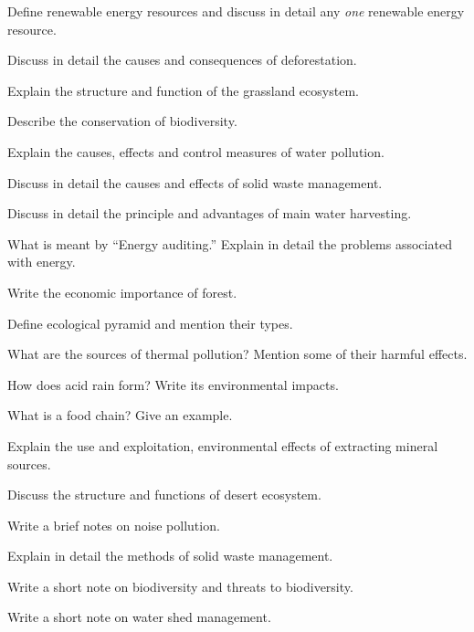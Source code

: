 \partC

\item Define renewable energy resources and discuss in detail any {\em one} renewable energy resource.
\Or
\item Discuss in detail the causes and consequences of deforestation.

\item Explain the structure and function of the grassland ecosystem.
\Or 
\item Describe the conservation of biodiversity.

\item Explain the causes, effects and control measures of water pollution.
\Or
\item Discuss in detail the causes and effects of solid waste management.

\item Discuss in detail the principle and advantages of main water harvesting.
\Or 
\item What is meant by ``Energy auditing.'' Explain in detail the problems associated with energy.

\markC
\ene

\newpage


\sub{\subj}
\maxtime

\partA

\iitem Write the economic importance of forest.
\item Define ecological pyramid and mention their types.
\item What are the sources of thermal pollution? Mention some of their harmful effects.
\item How does acid rain form? Write its environmental impacts.
\item What is a food chain? Give an example.

\markA
\partB

\item Explain the use and exploitation, environmental effects of extracting mineral sources.
\item Discuss the structure and functions of desert ecosystem.
\item Write a brief notes on noise pollution.
\item Explain in detail the methods of solid waste management.
\item Write a short note on biodiversity and threats to biodiversity.
\item Write a short note on water shed management.

